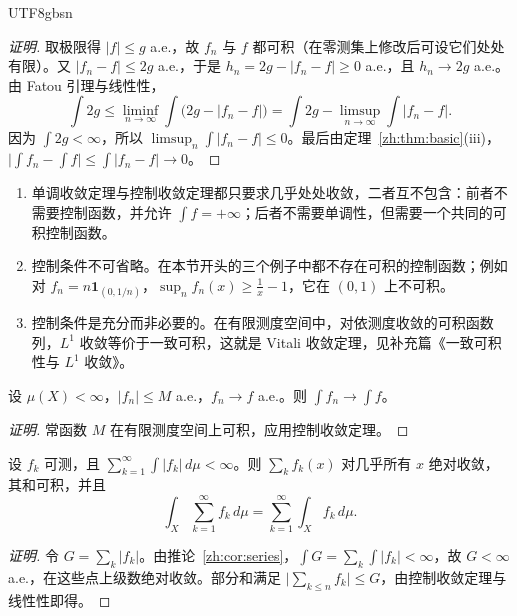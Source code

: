 \documentclass[11pt]{article}
\makeatletter
\newcommand{\envlabel}[1]{\protected@edef\@currentlabel{\themathenv}\label{#1}}
\makeatother
\begin{document}
\begin{CJK*}{UTF8}{gbsn}
\begin{proof}[证明]
取极限得 $|f|\leq g$ a.e.，故 $f_{n}$ 与 $f$ 都可积（在零测集上修改后可设它们处处有限）。又 $|f_{n}-f|\leq2g$ a.e.，于是 $h_{n}=2g-|f_{n}-f|\geq0$ a.e.，且 $h_{n}\to2g$ a.e.。由 Fatou 引理与线性性，
\[
\int2g\leq\liminf_{n\to\infty}\int\big(2g-|f_{n}-f|\big)=\int2g-\limsup_{n\to\infty}\int|f_{n}-f|.
\]
因为 $\int2g<\infty$，所以 $\limsup_{n}\int|f_{n}-f|\leq0$。最后由定理~\ref{zh:thm:basic}(iii)，$\big|\int f_{n}-\int f\big|\leq\int|f_{n}-f|\to0$。
\end{proof}

\begin{remark}\envlabel{zh:rem:dct}
\leavevmode
\begin{enumerate}
  \item 单调收敛定理与控制收敛定理都只要求几乎处处收敛，二者互不包含：前者不需要控制函数，并允许 $\int f=+\infty$；后者不需要单调性，但需要一个共同的可积控制函数。
  \item 控制条件不可省略。在本节开头的三个例子中都不存在可积的控制函数；例如对 $f_{n}=n\mathbf{1}_{(0,1/n)}$，$\sup_{n}f_{n}(x)\geq\frac1x-1$，它在 $(0,1)$ 上不可积。
  \item 控制条件是充分而非必要的。在有限测度空间中，对依测度收敛的可积函数列，$L^{1}$ 收敛等价于一致可积，这就是 Vitali 收敛定理，见补充篇《一致可积性与 $L^{1}$ 收敛》。
\end{enumerate}
\end{remark}

\begin{corollary}[有界收敛定理]\envlabel{zh:cor:bct}
设 $\mu(X)<\infty$，$|f_{n}|\leq M$ a.e.，$f_{n}\to f$ a.e.。则 $\int f_{n}\to\int f$。
\end{corollary}

\begin{proof}[证明]
常函数 $M$ 在有限测度空间上可积，应用控制收敛定理。
\end{proof}

\begin{corollary}[级数的逐项积分]\envlabel{zh:cor:series2}
设 $f_{k}$ 可测，且 $\sum_{k=1}^{\infty}\int|f_{k}|\,d\mu<\infty$。则 $\sum_{k}f_{k}(x)$ 对几乎所有 $x$ 绝对收敛，其和可积，并且
\[
\int_{X}\sum_{k=1}^{\infty}f_{k}\,d\mu=\sum_{k=1}^{\infty}\int_{X}f_{k}\,d\mu.
\]
\end{corollary}

\begin{proof}[证明]
令 $G=\sum_{k}|f_{k}|$。由推论~\ref{zh:cor:series}，$\int G=\sum_{k}\int|f_{k}|<\infty$，故 $G<\infty$ a.e.，在这些点上级数绝对收敛。部分和满足 $\big|\sum_{k\leq n}f_{k}\big|\leq G$，由控制收敛定理与线性性即得。
\end{proof}


\end{CJK*}
\end{document}
